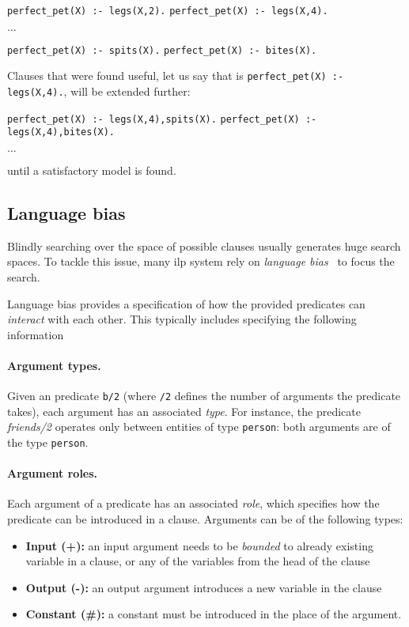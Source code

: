 \begin{center}
	\texttt{perfect\_pet(X) :- legs(X,2).} \quad \texttt{perfect\_pet(X) :- legs(X,4).}

	$\ldots$

	\texttt{perfect\_pet(X) :- spits(X).} \quad \texttt{perfect\_pet(X) :- bites(X).}
\end{center}


Clauses that were found useful, let us say that is \texttt{perfect\_pet(X) :- legs(X,4).}, will be extended further:


\begin{center}
	\texttt{perfect\_pet(X) :- legs(X,4),spits(X).} \quad \texttt{perfect\_pet(X) :- legs(X,4),bites(X).}

	$\ldots$
\end{center}

until a satisfactory model is found.







\subsection{Language bias}
\label{ch2:languagebias}

Blindly searching over the space of possible clauses usually generates huge search spaces.
To tackle this issue, many \gls{ilp} system rely on \textit{language bias}~\cite{DBLP:reference/ml/Blockeel17} to focus the search.


Language bias provides a specification of how the provided predicates can \textit{interact} with each other.
This typically includes specifying the following information


\paragraph{Argument types.} Given an predicate \texttt{b/2} (where \texttt{/2} defines the number of arguments the predicate takes), each argument has an associated \textit{type}. For instance, the predicate \textit{friends/2} operates only between entities of type \texttt{person}: both arguments are of the type \texttt{person}.


\paragraph{Argument roles.} Each argument of a predicate has an associated \textit{role}, which specifies how the predicate can be introduced in a clause.
Arguments can be of the following types:
\begin{itemize}
	\item \textbf{Input (+):} an input argument needs to be \textit{bounded} to already existing variable in a clause, or any of the variables from the head of the clause
	\item \textbf{Output (-):} an output argument introduces a new variable in the clause
	\item \textbf{Constant (\#):} a constant must be introduced in the place of the argument.
\end{itemize}

